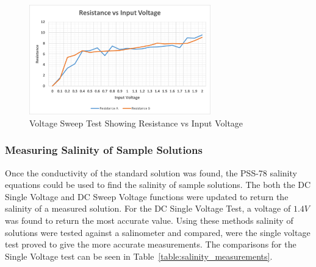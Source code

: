 \begin{figure}[H]
    \centering
    \includegraphics[width=0.7\textwidth]{figures/sal_vsweep.png}
    \caption{Voltage Sweep Test Showing Resistance vs Input Voltage}
    \label{fig:sal_vsweepdc}
\end{figure}

\subsubsection{Measuring Salinity of Sample Solutions}
Once the conductivity of the standard solution was found, the PSS-78 salinity equations could be used to find the salinity of sample solutions.
The both the DC Single Voltage and DC Sweep Voltage functions were updated to return the salinity of a measured solution.
For the DC Single Voltage Test, a voltage of $1.4V$ was found to return the most accurate value.
Using these methods salinity of solutions were tested against a salinometer and compared, were the single voltage test proved to give the more accurate measurements.
The comparisons for the Single Voltage test can be seen in Table~\ref{table:salinity_measurements}.

